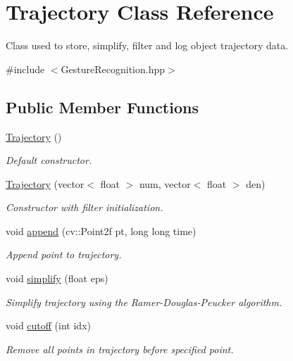 \hypertarget{classTrajectory}{\section{\-Trajectory \-Class \-Reference}
\label{classTrajectory}
}


\-Class used to store, simplify, filter and log object trajectory data.  




{\ttfamily \#include $<$\-Gesture\-Recognition.\-hpp$>$}

\subsection*{\-Public \-Member \-Functions}
\begin{DoxyCompactItemize}
\item 
\hyperlink{classTrajectory_aa340ba80f1f4d1aa39f19f069d5d8089}{\-Trajectory} ()
\begin{DoxyCompactList}\small\item\em \-Default constructor. \end{DoxyCompactList}\item 
\hyperlink{classTrajectory_a048133aaab9550b69329f77422efdb44}{\-Trajectory} (vector$<$ float $>$ num, vector$<$ float $>$ den)
\begin{DoxyCompactList}\small\item\em \-Constructor with filter initialization. \end{DoxyCompactList}\item 
void \hyperlink{classTrajectory_acca017975b503bea2f9b9d60b5ec5f24}{append} (cv\-::\-Point2f pt, long long time)
\begin{DoxyCompactList}\small\item\em \-Append point to trajectory. \end{DoxyCompactList}\item 
void \hyperlink{classTrajectory_a7d658ebae706cb92a145eb292abd72f3}{simplify} (float eps)
\begin{DoxyCompactList}\small\item\em \-Simplify trajectory using the \-Ramer-\/\-Douglas-\/\-Peucker algorithm. \end{DoxyCompactList}\item 
void \hyperlink{classTrajectory_ad47975efccadcd61f8311f8ca2a66b2c}{cutoff} (int idx)
\begin{DoxyCompactList}\small\item\em \-Remove all points in trajectory before specified point. \end{DoxyCompactList}\item 

\end{DoxyCompactItemize}
